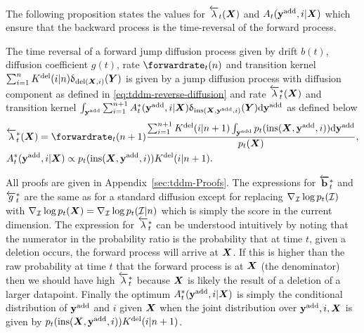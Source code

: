 The following proposition states the values for $\overleftarrow{\lambda}_t({\bm{X}})$ and $A_t(\mathbf{y}^{\textup{add}}, i | {\bm{X}})$ which ensure that the backward process is the time-reversal of the forward process.
\begin{proposition}
\label{prop:time_reversal}
The time reversal of a forward jump diffusion process given by drift $b(t)$, diffusion coefficient $g(t)$, rate $\forwardrate_t(n)$ and transition kernel $\sum_{i=1}^n K^{\textup{del}}(i | n) \updelta_{\textup{del}({\bm{X}}, i)}({\bm{Y}})$ is given by a jump diffusion process with diffusion component as defined in \cref{eq:tddm-reverse-diffusion} and rate $\overleftarrow{\lambda}_t^*({\bm{X}})$ and transition kernel $\int_{\mathbf{y}^{\textup{add}}} \sum_{i=1}^{n+1}  A^*_t(\mathbf{y}^{\textup{add}}, i | {\bm{X}}) \updelta_{\textup{ins}({\bm{X}}, \mathbf{y}^{\textup{add}}, i)}({\bm{Y}}) \mathrm{d} \mathbf{y}^{\textup{add}}$ as defined below
\begin{align}
    & \backwardrate_{t}^*(\mX) = \forwardrate_{t}(n+1) \frac{ \sum_{i=1}^{n+1} \delidxdist(i | n+1) \int_{\yadd} p_{t}( \textup{ins}(\mX, \yadd, i)) \rmd \yadd }{p_{t}(\mX)},\\
    & \autonet_{t}^*( \yadd, i | \mX) \propto p_{t}(\textup{ins}(\mX, \yadd, i) ) \delidxdist(i| n+1).
\end{align}
\end{proposition}
All proofs are given in Appendix~\ref{sec:tddm-Proofs}. The expressions for $\overleftarrow{\mathbf{b}}_t^*$ and $\overleftarrow{g}^*_t$ are the same as for a standard diffusion except for replacing $\nabla_{\mathcal{I}} \log p_t(\mathcal{I})$ with $\nabla_{\mathcal{I}} \log p_t({\bm{X}}) = \nabla_{\mathcal{I}} \log p_t(\mathcal{I} | n)$ which is simply the score in the current dimension.
The expression for $\overleftarrow{\lambda}_t^*$ can be understood intuitively by noting that the numerator in the probability ratio is the probability that at time $t$, given a deletion occurs, the forward process will arrive at ${\bm{X}}$. If this is higher than the raw probability at time $t$ that the forward process is at ${\bm{X}}$ (the denominator) then we should have high $\overleftarrow{\lambda}_t^*$ because ${\bm{X}}$ is likely the result of a deletion of a larger datapoint.
Finally the optimum $A^*_t(\mathbf{y}^{\textup{add}}, i | {\bm{X}})$ is simply the conditional distribution of $\mathbf{y}^{\textup{add}}$ and $i$ given ${\bm{X}}$ when the joint distribution over $\mathbf{y}^{\textup{add}}, i, {\bm{X}}$ is given by $p_{t}(\text{ins}({\bm{X}}, \mathbf{y}^{\textup{add}}, i) ) K^{\textup{del}}(i| n+1)$. 


